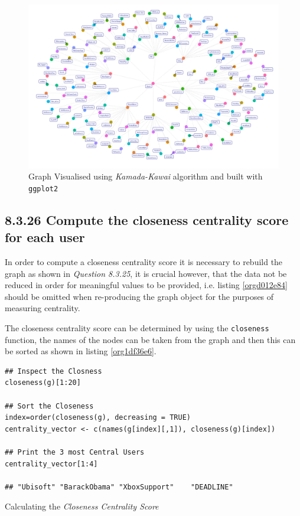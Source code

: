 \documentclass[11pt]{article}
\begin{document}
\begin{figure}[htbp]
\centering
\includegraphics[width=12cm]{./Figures/ggGraph.png}
\caption{\label{fig:org5f5d56d}Graph Visualised using \emph{Kamada-Kawai} algorithm and built with \texttt{ggplot2}}
\end{figure}
\subsection{8.3.26 Compute the \textbf{closeness} centrality score for each user}
\label{sec:orgef33f77}
In order to compute a closeness centrality score it is necessary to rebuild the
graph as shown in \emph{Question 8.3.25}, it is crucial however, that the data
not be reduced in order for meaningful values to be provided, i.e. listing
\ref{orgd012e84} should be omitted when re-producing the graph object for the purposes of measuring centrality.

The closeness centrality score can be determined by using the \texttt{closeness} function, the names of the nodes can be taken from the graph and then this can be sorted as shown in listing \ref{org1df36e6}.

\begin{listing}[htbp]
\begin{verbatim}
## Inspect the Closness
closeness(g)[1:20]

## Sort the Closeness
index=order(closeness(g), decreasing = TRUE)
centrality_vector <- c(names(g[index][,1]), closeness(g)[index])

## Print the 3 most Central Users
centrality_vector[1:4]

## "Ubisoft" "BarackObama" "XboxSupport"    "DEADLINE"
\end{verbatim}
\caption{\label{org1df36e6}Calculating the \emph{Closeness Centrality Score}}
\end{listing}
\end{document}

